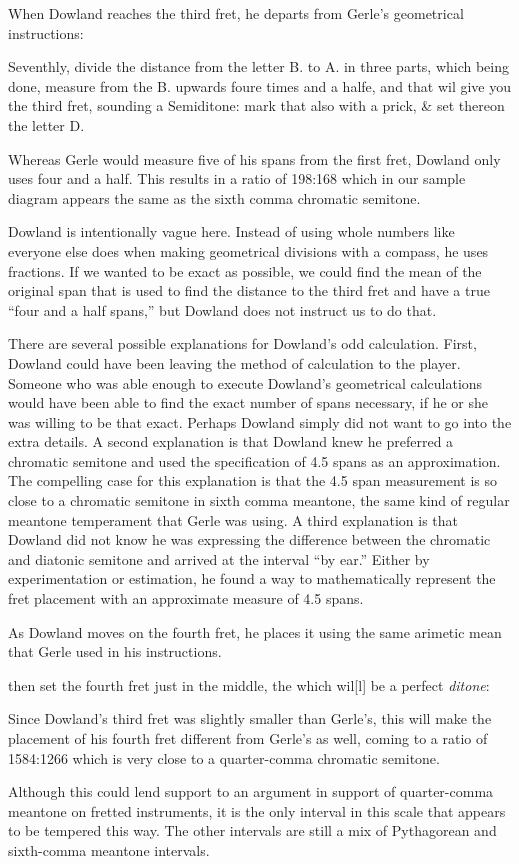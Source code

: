 When Dowland reaches the third fret, he departs from Gerle's geometrical instructions:
\begin{blocks}
Seventhly, divide the distance from the letter B. to A. in three parts, which being
done, measure from the B. upwards foure times and a halfe, and that wil give you the
third fret, sounding a Semiditone: mark that also with a prick, \& set thereon the
letter D.
\end{blocks}
Whereas Gerle would measure five of his spans from the first fret, Dowland only
uses four and a half. This results in a ratio of 198:168 which in our sample diagram
appears the same as the sixth comma chromatic semitone.

Dowland is intentionally vague here.  Instead of using whole numbers like everyone else
does when making geometrical divisions with a compass, he uses fractions. If we wanted
to be exact as possible, we could find the mean of the original span that is used to
find the distance to the third fret and have a true ``four and a half spans,'' but
Dowland does not instruct us to do that.

There are several possible explanations for Dowland's odd calculation.  First, Dowland
could have been leaving the method of calculation to the player.  Someone who was able
enough to execute Dowland's geometrical calculations would have been able to find the
exact number of spans necessary, if he or she was willing to be that exact.  Perhaps
Dowland simply did not want to go into the extra details. A second explanation is that
Dowland knew he preferred a chromatic semitone and used the specification of 4.5 spans
as an approximation.  The compelling case for this explanation is that the 4.5 span
measurement is so close to a chromatic semitone in sixth comma meantone, the same kind
of regular meantone temperament that Gerle was using. A third explanation is that
Dowland did not know he was expressing the difference between the chromatic and
diatonic semitone and arrived at the interval ``by ear.''  Either by experimentation or
estimation, he found a way to mathematically represent the fret placement with an
approximate measure of 4.5 spans.

As Dowland moves on the fourth fret, he places it using the same arimetic mean that
Gerle used in his instructions.
\begin{blocks}
then set the fourth fret just in the middle, the which wil[l] be a perfect
\emph{ditone}:
\end{blocks}
Since Dowland's third fret was slightly smaller than Gerle's, this will make the
placement of his fourth fret different from Gerle's as well, coming to a ratio of
1584:1266 which is very close to a quarter-comma chromatic semitone.

Although this could lend support to an argument in support of quarter-comma meantone on
fretted instruments, it is the only interval in this scale that appears to be tempered
this way.  The other intervals are still a mix of Pythagorean and sixth-comma meantone
intervals.

